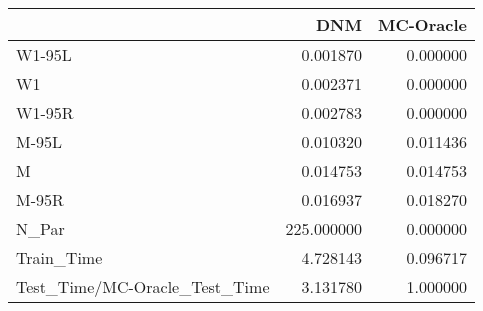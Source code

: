\begin{tabular}{lrr}
\toprule
{} &         DNM &  MC-Oracle \\
\midrule
W1-95L                        &    0.001870 &   0.000000 \\
W1                            &    0.002371 &   0.000000 \\
W1-95R                        &    0.002783 &   0.000000 \\
M-95L                         &    0.010320 &   0.011436 \\
M                             &    0.014753 &   0.014753 \\
M-95R                         &    0.016937 &   0.018270 \\
N\_Par                         &  225.000000 &   0.000000 \\
Train\_Time                    &    4.728143 &   0.096717 \\
Test\_Time/MC-Oracle\_Test\_Time &    3.131780 &   1.000000 \\
\bottomrule
\end{tabular}
